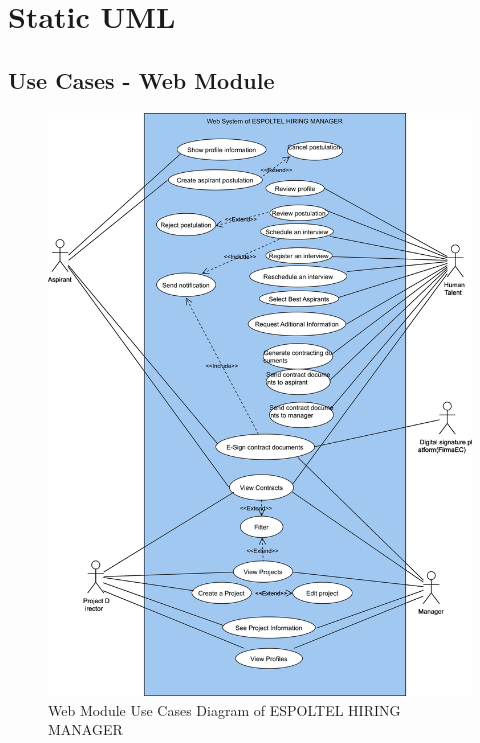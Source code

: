 \documentclass{scrreprt}
\begin{document}
\chapter{Static UML}
\section{Use Cases - Web Module}
\begin{figure}[H]
	\centering  \small
	\includegraphics[width=\textwidth]{UseCases/WebUseCases.jpg} 
	\caption{Web Module Use Cases Diagram of ESPOLTEL HIRING MANAGER}
	\label{fig:WebUseCases}
\end{figure}
\end{document}
